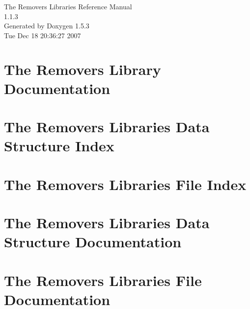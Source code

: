 \documentclass[a4paper]{book}
\begin{document}
\begin{titlepage}
\vspace*{7cm}
\begin{center}
{\Large The Removers Libraries Reference Manual\\[1ex]\large 1.1.3 }\\
\vspace*{1cm}
{\large Generated by Doxygen 1.5.3}\\
\vspace*{0.5cm}
{\small Tue Dec 18 20:36:27 2007}\\
\end{center}
\end{titlepage}
\clearemptydoublepage
{}
\tableofcontents
\clearemptydoublepage
{}
\chapter{The Removers Library Documentation }
\label{index}\hypertarget{index}{}
\chapter{The Removers Libraries Data Structure Index}

\chapter{The Removers Libraries File Index}

\chapter{The Removers Libraries Data Structure Documentation}








\chapter{The Removers Libraries File Documentation}












\printindex
\end{document}
